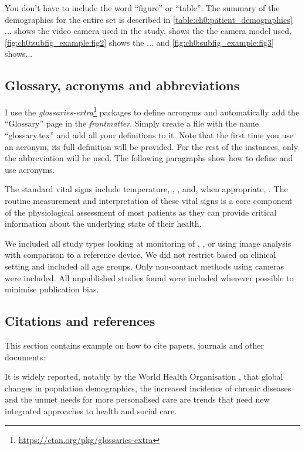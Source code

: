 You don't have to include the word ``figure'' or ``table'': The summary of the demographics for the entire set is described in \cref{table:ch0:patient_demographics} ...  shows the video camera used in the study.  shows the the camera model used, \cref{fig:ch0:subfig_example:fig2} shows the ... and \cref{fig:ch0:subfig_example:fig3} shows...


\subsection{Glossary, acronyms and abbreviations}


I use the \textit{glossaries-extra}\footnote{\url{https://ctan.org/pkg/glossaries-extra}} packages to define acronyms and automatically add the ``Glossary'' page in the \textit{frontmatter}. Simply create a file with the name ``glossary.tex'' and add all your definitions to it. Note that the first time you use an acronym, its full definition will be provided. For the rest of the instances, only the abbreviation will be used. The following paragraphs show how to define and use acronyms.

The standard vital signs include temperature, , ,  and, when appropriate, . The routine measurement and interpretation of these vital signs is a core component of the physiological assessment of most patients \cite{prior1977physical,goldberg2005practical} as they can provide critical information about the underlying state of their health. 

We included all study types looking at monitoring of , ,  or  using image analysis with comparison to a reference device. We did not restrict based on clinical setting and included all age groups. Only non-contact methods using cameras were included. All unpublished studies found were included wherever possible to minimise publication bias.


\subsection{Citations and references}

This section contains example on how to cite papers, journals and other documents:

It is widely reported, notably by the World Health Organisation \cite{stroetmann2010can}, that global changes in population demographics, the increased incidence of chronic diseases and the unmet needs for more personalised care are trends that need new integrated approaches to health and social care. \cite{brooks1984infrared}

